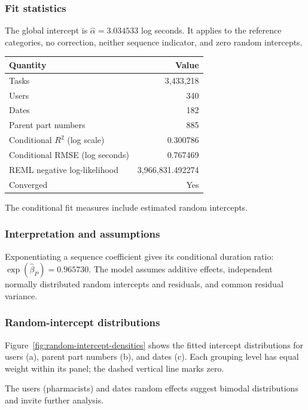 \subsubsection{Fit statistics}
The global intercept is \(\widehat\alpha=3.034533\) log seconds. It
applies to the reference categories, no correction, neither sequence
indicator, and zero random intercepts.
\begin{center}
\begin{tabular}{@{}lr@{}}
\toprule
Quantity & Value \\
\midrule
Tasks & 3,433,218 \\
Users & 340 \\
Dates & 182 \\
Parent part numbers & 885 \\
Conditional \(R^2\) (log scale) & 0.300786 \\
Conditional RMSE (log seconds) & 0.767469 \\
REML negative log-likelihood & 3,966,831.492274 \\
Converged & Yes \\
\bottomrule
\end{tabular}
\end{center}
The conditional fit measures include estimated random intercepts.

\subsubsection{Interpretation and assumptions}
Exponentiating a sequence coefficient gives its conditional duration
ratio: \(\exp(\widehat\beta_P)=0.965730\). The model assumes additive
effects, independent normally distributed random intercepts and
residuals, and common residual variance.

\subsubsection{Random-intercept distributions}
Figure~\ref{fig:random-intercept-densities} shows the fitted intercept
distributions for users (a), parent part numbers (b), and dates (c).
Each grouping level has equal weight within its panel; the dashed
vertical line marks zero.

The users (pharmacists) and dates random effects suggest bimodal
distributions and invite further analysis.

